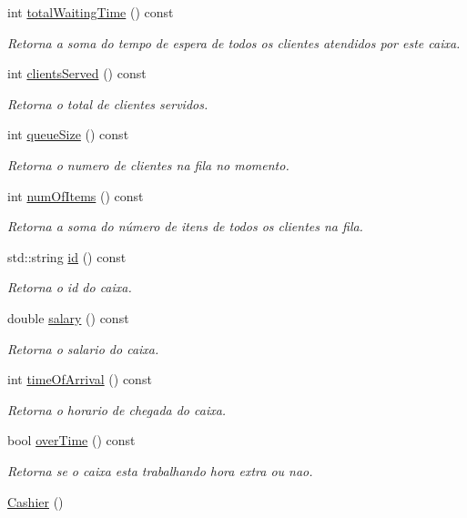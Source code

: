 \begin{DoxyCompactItemize}
int \hyperlink{classCashier_af627f5b03558df68531aa86e4eced5a2}{total\-Waiting\-Time} () const 
\begin{DoxyCompactList}\small\item\em Retorna a soma do tempo de espera de todos os clientes atendidos por este caixa. \end{DoxyCompactList}\item 
int \hyperlink{classCashier_ae6d59b96dd0a97414a883056487f9934}{clients\-Served} () const 
\begin{DoxyCompactList}\small\item\em Retorna o total de clientes servidos. \end{DoxyCompactList}\item 
int \hyperlink{classCashier_a6c4e3d00ebeb1e9af88feb6ff2285369}{queue\-Size} () const 
\begin{DoxyCompactList}\small\item\em Retorna o numero de clientes na fila no momento. \end{DoxyCompactList}\item 
int \hyperlink{classCashier_a20019398d52b20997fa109228268b583}{num\-Of\-Items} () const 
\begin{DoxyCompactList}\small\item\em Retorna a soma do número de itens de todos os clientes na fila. \end{DoxyCompactList}\item 
std\-::string \hyperlink{classCashier_a5c32d6426d9e272649151a965564afb1}{id} () const 
\begin{DoxyCompactList}\small\item\em Retorna o id do caixa. \end{DoxyCompactList}\item 
double \hyperlink{classCashier_ad394576caf7eb468ce5684181b53c83f}{salary} () const 
\begin{DoxyCompactList}\small\item\em Retorna o salario do caixa. \end{DoxyCompactList}\item 
int \hyperlink{classCashier_ac0bc4c8f7d5317f296a6ed103a75dfe4}{time\-Of\-Arrival} () const 
\begin{DoxyCompactList}\small\item\em Retorna o horario de chegada do caixa. \end{DoxyCompactList}\item 
bool \hyperlink{classCashier_a61d85cd680cc3611c5e9fa6d12544236}{over\-Time} () const 
\begin{DoxyCompactList}\small\item\em Retorna se o caixa esta trabalhando hora extra ou nao. \end{DoxyCompactList}\item 
\hyperlink{classCashier_a9dd99a4a5f4c5295aaa4584b21e30aec}{Cashier} ()
\end{DoxyCompactItemize}
